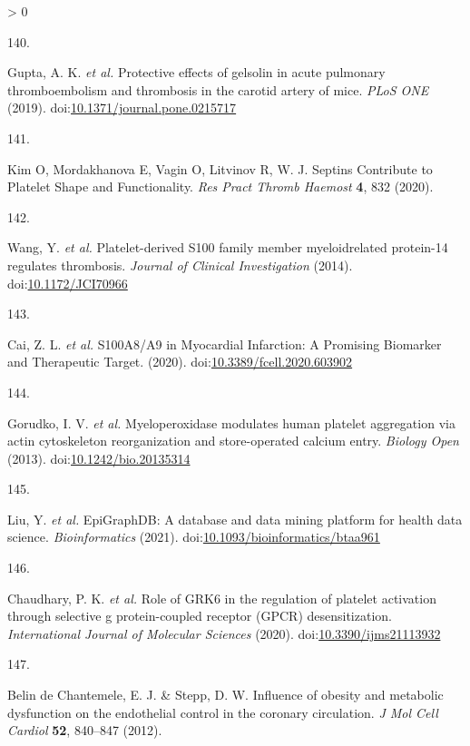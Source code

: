 \documentclass[11pt,twoside]{bristolthesis}
\newlength{\cslhangindent}
\newlength{\csllabelwidth}
\newenvironment{CSLReferences}[2] %
 {%
  \setlength{\parindent}{0pt}
  \ifodd #1 \everypar{\setlength{\hangindent}{\cslhangindent}}\ignorespaces\fi
  \ifnum #2 > 0
  \setlength{\parskip}{#2\baselineskip}
  \fi
 }%
 {}
\newcommand{\CSLLeftMargin}[1]{\parbox[t]{\csllabelwidth}{#1}}
\newcommand{\CSLRightInline}[1]{\parbox[t]{\linewidth - \csllabelwidth}{#1}\break}
\begin{document}
\begin{CSLReferences}{0}{0}
\leavevmode\hypertarget{ref-Gupta2019}{}%
\CSLLeftMargin{140. }
\CSLRightInline{Gupta, A. K. \emph{et al.} {Protective effects of gelsolin in acute pulmonary thromboembolism and thrombosis in the carotid artery of mice}. \emph{PLoS ONE} (2019). doi:\href{https://doi.org/10.1371/journal.pone.0215717}{10.1371/journal.pone.0215717}}

\leavevmode\hypertarget{ref-Kim2020}{}%
\CSLLeftMargin{141. }
\CSLRightInline{Kim O, Mordakhanova E, Vagin O, Litvinov R, W. J. {Septins Contribute to Platelet Shape and Functionality}. \emph{Res Pract Thromb Haemost} \textbf{4}, 832 (2020).}

\leavevmode\hypertarget{ref-Wang2014a}{}%
\CSLLeftMargin{142. }
\CSLRightInline{Wang, Y. \emph{et al.} {Platelet-derived S100 family member myeloidrelated protein-14 regulates thrombosis}. \emph{Journal of Clinical Investigation} (2014). doi:\href{https://doi.org/10.1172/JCI70966}{10.1172/JCI70966}}

\leavevmode\hypertarget{ref-Cai2020}{}%
\CSLLeftMargin{143. }
\CSLRightInline{Cai, Z. L. \emph{et al.} {S100A8/A9 in Myocardial Infarction: A Promising Biomarker and Therapeutic Target}. (2020). doi:\href{https://doi.org/10.3389/fcell.2020.603902}{10.3389/fcell.2020.603902}}

\leavevmode\hypertarget{ref-Gorudko2013}{}%
\CSLLeftMargin{144. }
\CSLRightInline{Gorudko, I. V. \emph{et al.} {Myeloperoxidase modulates human platelet aggregation via actin cytoskeleton reorganization and store-operated calcium entry}. \emph{Biology Open} (2013). doi:\href{https://doi.org/10.1242/bio.20135314}{10.1242/bio.20135314}}

\leavevmode\hypertarget{ref-Liu2021}{}%
\CSLLeftMargin{145. }
\CSLRightInline{Liu, Y. \emph{et al.} {EpiGraphDB: A database and data mining platform for health data science}. \emph{Bioinformatics} (2021). doi:\href{https://doi.org/10.1093/bioinformatics/btaa961}{10.1093/bioinformatics/btaa961}}

\leavevmode\hypertarget{ref-Chaudhary2020}{}%
\CSLLeftMargin{146. }
\CSLRightInline{Chaudhary, P. K. \emph{et al.} {Role of GRK6 in the regulation of platelet activation through selective g protein-coupled receptor (GPCR) desensitization}. \emph{International Journal of Molecular Sciences} (2020). doi:\href{https://doi.org/10.3390/ijms21113932}{10.3390/ijms21113932}}

\leavevmode\hypertarget{ref-BelindeChantemele2012a}{}%
\CSLLeftMargin{147. }
\CSLRightInline{Belin de Chantemele, E. J. \& Stepp, D. W. {Influence of obesity and metabolic dysfunction on the endothelial control in the coronary circulation}. \emph{J Mol Cell Cardiol} \textbf{52}, 840--847 (2012).}


\end{CSLReferences}
\end{document}

